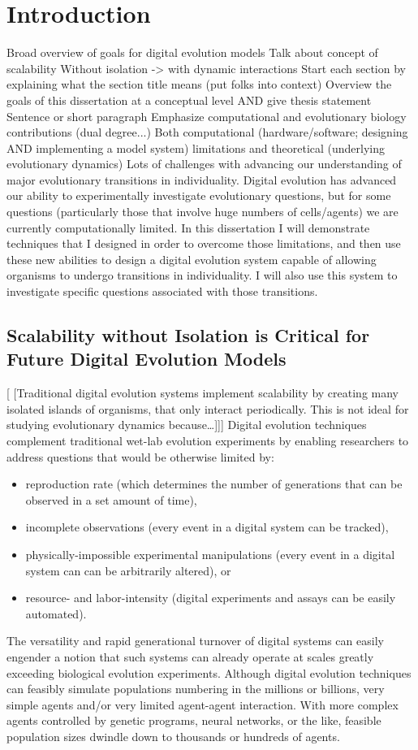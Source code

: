\chapter{Introduction}

Broad overview of goals for digital evolution models
Talk about concept of scalability
Without isolation -> with dynamic interactions
Start each section by explaining what the section title means (put folks into context)
Overview the goals of this dissertation at a conceptual level AND give thesis statement
Sentence or short paragraph
Emphasize computational and evolutionary biology contributions (dual degree...)
Both computational (hardware/software; designing AND implementing a model system) limitations and theoretical (underlying evolutionary dynamics)
Lots of challenges with advancing our understanding of major evolutionary transitions in individuality.
Digital evolution has advanced our ability to experimentally investigate evolutionary questions, but for some questions (particularly those that involve huge numbers of cells/agents) we are currently computationally limited.
In this dissertation I will demonstrate techniques that I designed in order to overcome those limitations, and then use these new abilities to design a digital evolution system capable of allowing organisms to undergo transitions in individuality.
I will also use this system to investigate specific questions associated with those transitions.

\section{Scalability without Isolation is Critical for Future Digital Evolution Models}
[
[Traditional digital evolution systems implement scalability by creating many isolated islands of organisms, that only interact periodically.
This is not ideal for studying evolutionary dynamics because…]]]
Digital evolution techniques complement traditional wet-lab evolution experiments by enabling researchers to address questions that would be otherwise limited by:
\begin{itemize}
\item reproduction rate (which determines the number of generations that can be observed in a set amount of time),
\item incomplete observations (every event in a digital system can be tracked),
\item physically-impossible experimental manipulations (every event in a digital system can can be arbitrarily altered), or
\item resource- and labor-intensity (digital experiments and assays can be easily automated).
\end{itemize}
The versatility and rapid generational turnover of digital systems can easily engender a notion that such systems can already operate at scales greatly exceeding biological evolution experiments.
Although digital evolution techniques can feasibly simulate populations numbering in the millions or billions, very simple agents and/or very limited agent-agent interaction.
With more complex agents controlled by genetic programs, neural networks, or the like, feasible population sizes dwindle down to thousands or hundreds of agents.

